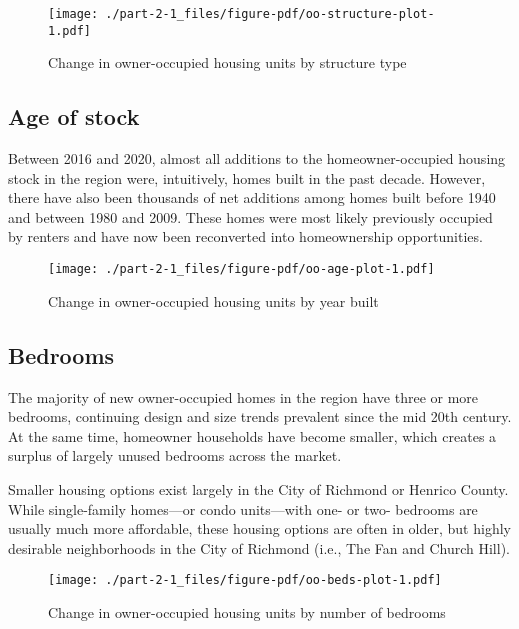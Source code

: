 \documentclass[
  letterpaper,
  DIV=11,
  numbers=noendperiod]{scrreprt}
\begin{document}
\begin{figure}

{\centering \texttt{[image: ./part-2-1\_files/figure-pdf/oo-structure-plot-1.pdf]}

}

\caption{Change in owner-occupied housing units by structure type}

\end{figure}

\hypertarget{age-of-stock}{%
\subsection{Age of stock}\label{age-of-stock}}

Between 2016 and 2020, almost all additions to the homeowner-occupied
housing stock in the region were, intuitively, homes built in the past
decade. However, there have also been thousands of net additions among
homes built before 1940 and between 1980 and 2009. These homes were most
likely previously occupied by renters and have now been reconverted into
homeownership opportunities.

\begin{figure}

{\centering \texttt{[image: ./part-2-1\_files/figure-pdf/oo-age-plot-1.pdf]}

}

\caption{Change in owner-occupied housing units by year built}

\end{figure}

\hypertarget{bedrooms}{%
\subsection{Bedrooms}\label{bedrooms}}

The majority of new owner-occupied homes in the region have three or
more bedrooms, continuing design and size trends prevalent since the mid
20th century. At the same time, homeowner households have become
smaller, which creates a surplus of largely unused bedrooms across the
market.

Smaller housing options exist largely in the City of Richmond or Henrico
County. While single-family homes---or condo units---with one- or two-
bedrooms are usually much more affordable, these housing options are
often in older, but highly desirable neighborhoods in the City of
Richmond (i.e., The Fan and Church Hill).

\begin{figure}

{\centering \texttt{[image: ./part-2-1\_files/figure-pdf/oo-beds-plot-1.pdf]}

}

\caption{Change in owner-occupied housing units by number of bedrooms}

\end{figure}
\end{document}
